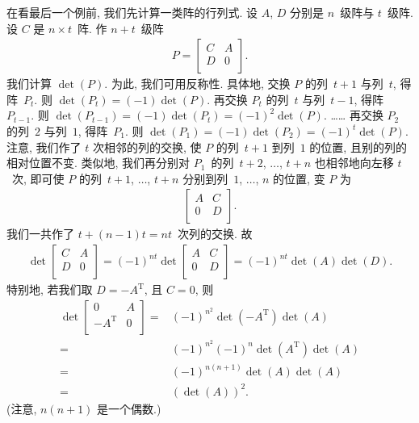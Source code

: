 \documentclass[../libro.tex]{subfiles}
\begin{document}
在看最后一个例前, 我们先计算一类阵的行列式.
设 \(A\), \(D\) 分别是 \(n\)~级阵与 \(t\)~级阵.
设 \(C\) 是 \(n \times t\)~阵.
作 \(n + t\)~级阵
\begin{align*}
    P =
    \begin{bmatrix}
        C & A \\
        D & 0 \\
    \end{bmatrix}.
\end{align*}
我们计算 \(\det {(P)}\).
为此, 我们可用反称性.
具体地, 交换 \(P\) 的列~\(t+1\) 与列~\(t\),
得阵~\(P_t\).
则 \(\det {(P_t)} = (-1) \det {(P)}\).
再交换 \(P_t\) 的列~\(t\) 与列~\(t-1\),
得阵~\(P_{t-1}\).
则 \(\det {(P_{t-1})} = (-1) \det {(P_t)}
= (-1)^2 \det {(P)}\).
……
再交换 \(P_2\) 的列~\(2\) 与列~\(1\),
得阵~\(P_1\).
则 \(\det {(P_1)} = (-1) \det {(P_2)}
= (-1)^t \det {(P)}\).
注意, 我们作了 \(t\) 次相邻的列的交换,
使 \(P\) 的列~\(t+1\) 到列~\(1\) 的位置,
且别的列的相对位置不变.
类似地, 我们再分别对 \(P_1\)~的列~\(t+2\), \(\dots\), \(t+n\)
也相邻地向左移 \(t\)~次,
即可使 \(P\) 的列~\(t+1\), \(\dots\), \(t+n\)
分别到列~\(1\), \(\dots\), \(n\) 的位置,
变 \(P\) 为
\begin{align*}
    \begin{bmatrix}
        A & C \\
        0 & D \\
    \end{bmatrix}.
\end{align*}
我们一共作了 \(t + (n-1)t = nt\)~次列的交换.
故
\begin{align*}
    \det {
        \begin{bmatrix}
            C & A \\
            D & 0 \\
        \end{bmatrix}
    }
    = (-1)^{nt} \det {
        \begin{bmatrix}
            A & C \\
            0 & D \\
        \end{bmatrix}
    }
    = (-1)^{nt} \det {(A)} \det {(D)}.
\end{align*}
特别地, 若我们取 \(D = -A^{\mathrm{T}}\),
且 \(C = 0\),
则
\begin{align*}
    \det {
        \begin{bmatrix}
            0               & A \\
            -A^{\mathrm{T}} & 0 \\
        \end{bmatrix}
    }
    = {} &
    (-1)^{n^2} \det {(-A^{\mathrm{T}})} \det {(A)}
    \\
    = {} &
    (-1)^{n^2} (-1)^n \det {(A^{\mathrm{T}})} \det {(A)}
    \\
    = {} &
    (-1)^{n(n+1)} \det {(A)} \det {(A)}
    \\
    = {} &
    (\det {(A)})^2.
\end{align*}
(注意, \(n(n+1)\) 是一个偶数.)
\end{document}
